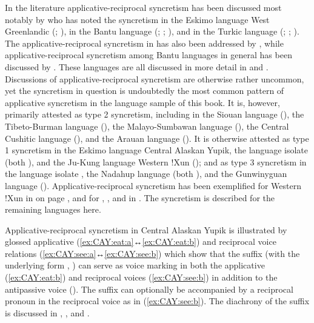 In the literature applicative-reciprocal syncretism has been discussed most notably by \citeauthor{nedjalkov:2007a} who has noted the syncretism in the Eskimo language West Greenlandic (; \citeyear[174]{nedjalkov:2007c}), in the Bantu language  (; \citeyear[42]{nedjalkov:2007b}; \citeyear[275]{nedjalkov:2007d}), and in the Turkic language  (; \citeyear[237]{nedjalkov:2007d}; \citealt{nedjalkov:nedjalkov:2007}). The applicative-reciprocal syncretism in  has also been addressed by \cite{maslova:2007}, while applicative-reciprocal syncretism among Bantu languages in general has been discussed by \cite{bostoen:al:2015}. These languages are all discussed in more detail in  and . Discussions of applicative-reciprocal syncretism are otherwise rather uncommon, yet the syncretism in question is undoubtedly the most common pattern of applicative syncretism in the language sample of this book. It is, however, primarily attested as type 2 syncretism, including in the Siouan language  (), the Tibeto-Burman language  (), the Malayo-Sumbawan language  (), the Central Cushitic language  (), and the Arauan language  (). It is otherwise attested as type 1 syncretism in the Eskimo language Central Alaskan Yupik, the language isolate  (both ), and the Ju-Kung language Western !Xun (); and as type 3 syncretism in the language isolate , the Nadahup language  (both ), and the Gunwinyguan language  (). Applicative-reciprocal syncretism has been exemplified for Western !Xun in  on page \pageref{tab:ch3:type1a-examples-1}, and for , , and  in . The syncretism is described for the remaining languages here.

Applicative-reciprocal syncretism in Central Alaskan Yupik is illustrated by glossed applicative (\ref{ex:CAY:eat:a}↔\ref{ex:CAY:eat:b}) and reciprocal voice relations (\ref{ex:CAY:see:a}↔\ref{ex:CAY:see:b}) which show that the suffix  (with the underlying form , \citealt[830ff.]{miyaoka:2012}) can serve as voice marking in both the applicative (\ref{ex:CAY:eat:b}) and reciprocal voices (\ref{ex:CAY:see:b}) in addition to the antipassive voice (). The suffix can optionally be accompanied by a reciprocal pronoun in the reciprocal voice \citep[928]{miyaoka:2012} as in (\ref{ex:CAY:see:b}). The diachrony of the suffix is discussed in , , and .

